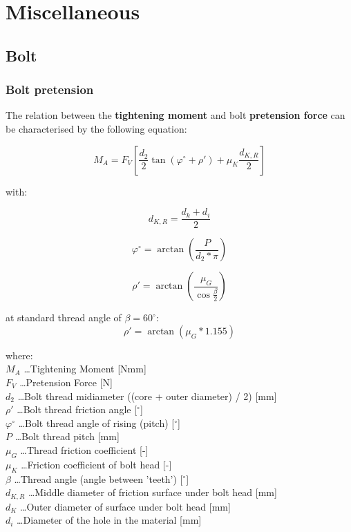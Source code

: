 \newpage
\chapter{Miscellaneous}

\section{Bolt}

\subsection{Bolt pretension}

The relation between the \textbf{tightening moment} and bolt \textbf{pretension force}
can be characterised by the following equation:

\begin{equation}
    M_A = F_V \left[
        \frac{d_2}{2} \tan{\left( \varphi^{\circ} + \rho'\right )}
            + \mu_K \frac{d_{K,R}}{2}
    \right]
\end{equation}

with:

\begin{equation}
    d_{K,R} = \frac{d_k + d_{i}}{2}
\end{equation}

\begin{equation}
    \varphi^{\circ} = \arctan{\left( \frac{P}{d_2 * \pi} \right)}
\end{equation}

\begin{equation}
    \rho' = \arctan{\left( \frac{\mu_G}{\cos{ \frac{\beta}{2} }} \right)}
\end{equation}

at standard thread angle of $ \beta = 60^{\circ} $:
\begin{equation}
    \rho' = \arctan{\left(\mu_G * 1.155 \right)}
\end{equation}

where:\\
$ M_A $ \ldots Tightening Moment [Nmm] \\
$ F_V $ \ldots Pretension Force [N] \\
$ d_2 $ \ldots Bolt thread midiameter ((core + outer diameter) / 2) [mm]\\
$ \rho' $ \ldots Bolt thread friction angle [$ ^{\circ} $]\\
$ \varphi^{\circ} $ \ldots Bolt thread angle of rising (pitch) [$ ^{\circ} $]\\
$ P $ \ldots Bolt thread pitch [mm]\\
$ \mu_G $ \ldots Thread friction coefficient [-]\\
$ \mu_K $ \ldots Friction coefficient of bolt head [-]\\
$ \beta $ \ldots Thread angle (angle between 'teeth') [$ ^{\circ} $]\\
$ d_{K,R} $ \ldots Middle diameter of friction surface under bolt head [mm]\\
$ d_{K} $ \ldots Outer diameter of surface under bolt head [mm]\\
$ d_{i} $ \ldots Diameter of the hole in the material [mm]\\


